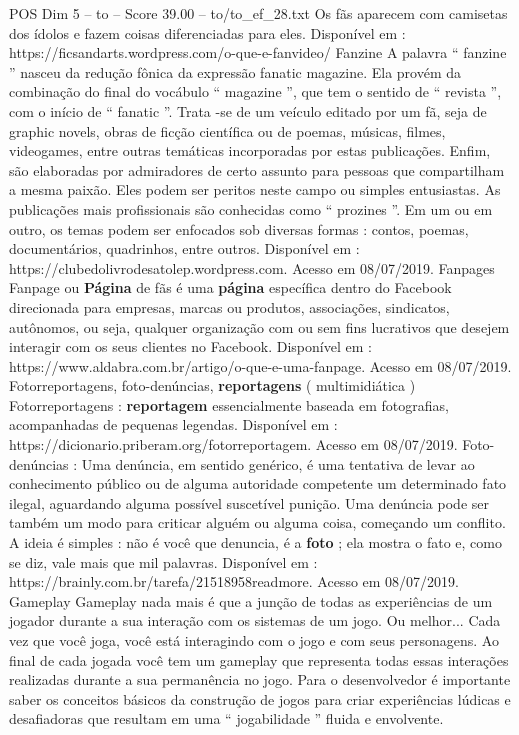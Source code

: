 \begin{textsample}{POS Dim 5 – to – Score 39.00 – to/to\_ef\_28.txt}
Os fãs aparecem com camisetas dos ídolos e fazem coisas diferenciadas para eles.
Disponível em : https://ficsandarts.wordpress.com/o-que-e-fanvideo/ Fanzine A palavra “ fanzine ” nasceu da redução fônica da expressão fanatic magazine.
Ela provém da combinação do final do vocábulo “ magazine ”, que tem o sentido de “ revista ”, com o início de “ fanatic ”.
Trata -se de um veículo editado por um fã, seja de graphic novels, obras de ficção científica ou de poemas, músicas, filmes, videogames, entre outras temáticas incorporadas por estas publicações.
Enfim, são elaboradas por admiradores de certo assunto para pessoas que compartilham a mesma paixão.
Eles podem ser peritos neste campo ou simples entusiastas.
As publicações mais profissionais são conhecidas como “ prozines ”.
Em um ou em outro, os temas podem ser enfocados sob diversas formas : contos, poemas, documentários, quadrinhos, entre outros.
Disponível em : https://clubedolivrodesatolep.wordpress.com.
Acesso em 08/07/2019.
Fanpages Fanpage ou \textbf{Página} de fãs é uma \textbf{página} específica dentro do Facebook direcionada para empresas, marcas ou produtos, associações, sindicatos, autônomos, ou seja, qualquer organização com ou sem fins lucrativos que desejem interagir com os seus clientes no Facebook.
Disponível em : https://www.aldabra.com.br/artigo/o-que-e-uma-fanpage.
Acesso em 08/07/2019.
Fotorreportagens, foto-denúncias, \textbf{reportagens} ( multimidiática ) Fotorreportagens : \textbf{reportagem} essencialmente baseada em fotografias, acompanhadas de pequenas legendas.
Disponível em : https://dicionario.priberam.org/fotorreportagem.
Acesso em 08/07/2019.
Foto-denúncias : Uma denúncia, em sentido genérico, é uma tentativa de levar ao conhecimento público ou de alguma autoridade competente um determinado fato ilegal, aguardando alguma possível suscetível punição.
Uma denúncia pode ser também um modo para criticar alguém ou alguma coisa, começando um conflito.
A ideia é simples : não é você que denuncia, é a \textbf{foto} ; ela mostra o fato e, como se diz, vale mais que mil palavras.
Disponível em : https://brainly.com.br/tarefa/21518958readmore.
Acesso em 08/07/2019.
Gameplay Gameplay nada mais é que a junção de todas as experiências de um jogador durante a sua interação com os sistemas de um jogo.
Ou melhor...
Cada vez que você joga, você está interagindo com o jogo e com seus personagens.
Ao final de cada jogada você tem um gameplay que representa todas essas interações realizadas durante a sua permanência no jogo.
Para o desenvolvedor é importante saber os conceitos básicos da construção de jogos para criar experiências lúdicas e desafiadoras que resultam em uma “ jogabilidade ” fluida e envolvente.

\end{textsample}
